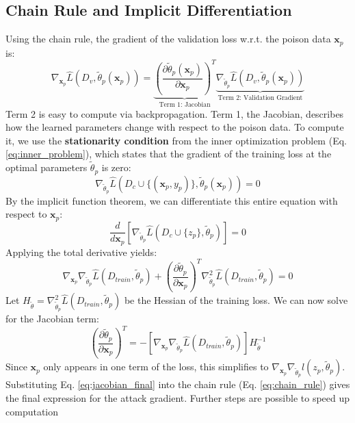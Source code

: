 \documentclass[11pt]{report}
\begin{document}
\subsection{Chain Rule and Implicit Differentiation}
Using the chain rule, the gradient of the validation loss w.r.t. the poison data $\bm{x}_p$ is:
\begin{equation}
    \nabla_{\bm{x}_p} \hat{L}(D_{v}, \tilde{\theta}_p(\bm{x}_p)) = \underbrace{\left( \frac{\partial \tilde{\theta}_p(\bm{x}_p)}{\partial \bm{x}_p} \right)^T}_{\text{Term 1: Jacobian}} \underbrace{\nabla_{\tilde{\theta}_p} \hat{L}(D_v, \tilde{\theta}_p(\bm{x}_p))}_{\text{Term 2: Validation Gradient}}
    \label{eq:chain_rule}
\end{equation}
Term 2 is easy to compute via backpropagation. Term 1, the Jacobian, describes how the learned parameters change with respect to the poison data. To compute it, we use the \textbf{stationarity condition} from the inner optimization problem (Eq. \ref{eq:inner_problem}), which states that the gradient of the training loss at the optimal parameters $\tilde{\theta}_p$ is zero:
\begin{equation}
    \nabla_{\tilde{\theta}_p} \hat{L}(D_c \cup \{(\bm{x}_p, y_p)\}, \tilde{\theta}_p(\bm{x}_p)) = 0
\end{equation}
By the implicit function theorem, we can differentiate this entire equation with respect to $\bm{x}_p$:
\begin{equation}
    \frac{d}{d\bm{x}_p} \left[ \nabla_{\tilde{\theta}_p} \hat{L}(D_c \cup \{z_p\}, \tilde{\theta}_p) \right] = 0
\end{equation}
Applying the total derivative yields:
\begin{equation}
    \nabla_{\bm{x}_p} \nabla_{\tilde{\theta}_p} \hat{L}(D_{train}, \tilde{\theta}_p) + \left(\frac{\partial \tilde{\theta}_p}{\partial \bm{x}_p}\right)^T \nabla_{\tilde{\theta}_p}^2 \hat{L}(D_{train}, \tilde{\theta}_p) = 0
\end{equation}
Let $H_{\tilde{\theta}} = \nabla_{\tilde{\theta}_p}^2 \hat{L}(D_{train}, \tilde{\theta}_p)$ be the Hessian of the training loss. We can now solve for the Jacobian term:
\begin{equation}
    \left(\frac{\partial \tilde{\theta}_p}{\partial \bm{x}_p}\right)^T = - \left[ \nabla_{\bm{x}_p} \nabla_{\tilde{\theta}_p} \hat{L}(D_{train}, \tilde{\theta}_p) \right] H_{\tilde{\theta}}^{-1}
    \label{eq:jacobian_final}
\end{equation}
Since $\bm{x}_p$ only appears in one term of the loss, this simplifies to $\nabla_{\bm{x}_p} \nabla_{\tilde{\theta}_p} l(z_p, \tilde{\theta}_p)$. Substituting Eq. \ref{eq:jacobian_final} into the chain rule (Eq. \ref{eq:chain_rule}) gives the final expression for the attack gradient. Further steps are possible to speed up computation ~\cite{koh2017understanding}
\end{document}
